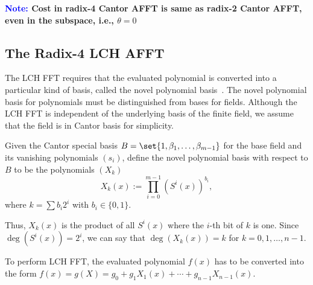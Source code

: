 \documentclass[11pt,runningheads]{llncs}
\begin{document}
\noindent \textbf{\textcolor{blue}{Note:} Cost in radix-4 Cantor AFFT is same as radix-2 Cantor AFFT, even in the subspace, i.e., $\theta=0$}







\subsection{The Radix-4 LCH AFFT}

The LCH FFT requires that the evaluated polynomial is converted into a particular kind of basis, called the novel polynomial basis~\cite{LCH-basis2014}. The novel polynomial basis for polynomials must be distinguished from bases for fields. Although the LCH FFT is independent of the underlying basis of the finite field, we assume that the field is in Cantor basis for simplicity.

\begin{definition}
    Given the Cantor special basis $B=\set{1,\beta_1,\ldots,\beta_{m-1}}$ for the base field and its vanishing polynomials $(s_i)$, define the novel polynomial basis with respect to $B$ to be the polynomials $(X_k)$
    \[ X_k(x) := \prod_{i=0}^{m-1} (S^i(x))^{b_i}, \]
    where $k = \sum b_i 2^i$ with $b_i \in \{0, 1\}$.
\end{definition}

Thus, $X_k(x)$ is the product of all $S^i(x)$ where the $i$-th bit of $k$ is one. Since $\deg(S^i(x)) = 2^i$, we can say that $\deg(X_k(x)) = k$ for $k=0,1,\ldots,n-1$.

\noindent To perform LCH FFT, the evaluated polynomial $f(x)$ has to be converted into the form $f(x) = g(X) = g_0 + g_1X_1(x) + \cdots + g_{n-1}X_{n-1}(x)$.
\end{document}
